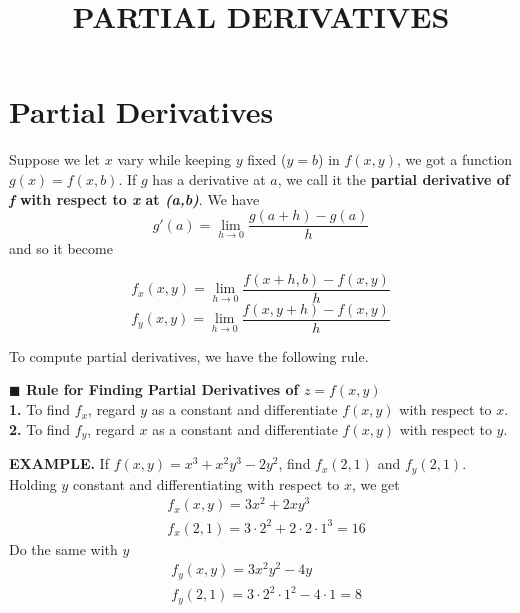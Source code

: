\documentclass{article}
\title{PARTIAL DERIVATIVES}
\date{}
\author{}
\begin{document}
\section{Partial Derivatives}
Suppose we let $x$ vary while keeping $y$ fixed ($y = b$) in $f(x,y)$, we got a function $g(x) = f(x,b)$. If $g$ has a derivative at $a$, we call it the \textbf{partial derivative of \textit{f} with respect to \textit{x} at \textit{(a,b)}}. We have 
\[g'(a) = \lim_{h \to  0 }\frac{g(a + h) - g(a)}{h }\]
and so it become $\quad$
\begin{minipage}[]{0.6\linewidth}
\begin{mdframed}
\[f_x (x,y) = \lim_{h \to 0} \frac{f(x + h, b) - f(x,y)}{h }\]
\[f_y (x,y) = \lim_{h \to 0} \frac{f(x , y + h) - f(x,y)}{h }\]
  \end{mdframed}
\end{minipage}

To compute partial derivatives, we have the following rule.
\begin{mdframed}
  {\selectfont \textbf{\textcolor{blue5}{\small $\blacksquare$ Rule for Finding Partial Derivatives of $z = f(x,y)$}}} \\
{\selectfont \textbf{\small 1.}} To find $f_x$, regard $y$ as a constant and differentiate $f(x,y)$ with respect to $x$.\\
{\selectfont \textbf{\small 2.}} To find $f_y$, regard $x$ as a constant and differentiate $f(x,y)$ with respect to $y$.
\end{mdframed}
{\selectfont \textbf{\textcolor{blue5}{{\small {}} EXAMPLE.}}} If $f(x,y) = x^3 + x^2 y^3 - 2y^2$, find $f_x(2,1)$ and $f_y(2,1)$.
Holding $y$ constant and differentiating with respect to $x$, we get 
\begin{equation*}
  \begin{split}
 &   f_x(x,y) = 3 x^2 + 2x y^3 \\
 &  f_x(2,1) = 3 \cdot 2^2 + 2 \cdot 2 \cdot 1^3 = 16
  \end{split}
\end{equation*}
Do the same with $y$
\begin{equation*}
  \begin{split}
    & f_y (x,y) = 3 x^2 y^2 - 4y \\
    & f_y (2,1) = 3 \cdot 2^2 \cdot 1^2 - 4 \cdot 1 = 8       
  \end{split}
\end{equation*}
\end{document}
